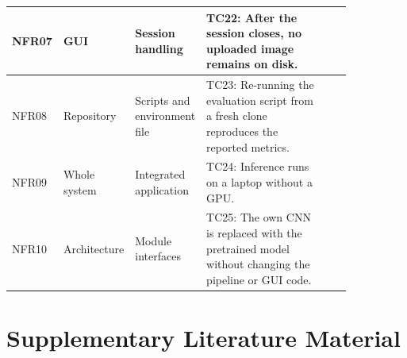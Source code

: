 \begin{table}[H]
\begin{tabular}{|p{0.07\linewidth}|p{0.15\linewidth}|p{0.16\linewidth}|p{0.39\linewidth}|p{0.08\linewidth}|}
    \hline
    NFR07 & GUI & Session handling & TC22: After the session closes, no uploaded image remains on disk. & \\
    \hline
    NFR08 & Repository & Scripts and environment file & TC23: Re-running the evaluation script from a fresh clone reproduces the reported metrics. & \\
    \hline
    NFR09 & Whole system & Integrated application & TC24: Inference runs on a laptop without a GPU. & \\
    \hline
    NFR10 & Architecture & Module interfaces & TC25: The own CNN is replaced with the pretrained model without changing the pipeline or GUI code. & \\
    \hline
  \end{tabular}
\end{table}

\chapter{Supplementary Literature Material}
\label{app:lit}

